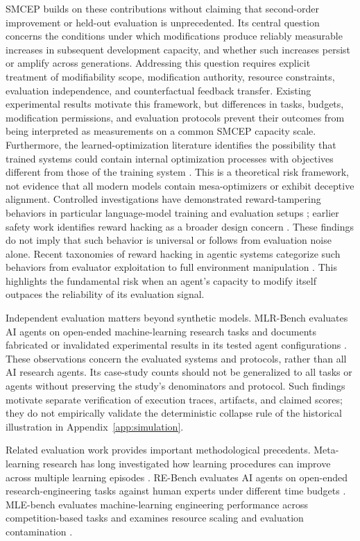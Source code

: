 \documentclass[11pt,a4paper]{article}
\begin{document}
SMCEP builds on these contributions without claiming that second-order improvement or held-out evaluation is unprecedented. Its central question concerns the conditions under which modifications produce reliably measurable increases in subsequent development capacity, and whether such increases persist or amplify across generations. Addressing this question requires explicit treatment of modifiability scope, modification authority, resource constraints, evaluation independence, and counterfactual feedback transfer. Existing experimental results motivate this framework, but differences in tasks, budgets, modification permissions, and evaluation protocols prevent their outcomes from being interpreted as
measurements on a common SMCEP capacity scale. Furthermore, the learned-optimization literature identifies the possibility that trained systems could contain internal optimization processes with objectives different from those of the training system \cite{hubinger2019}. This is a theoretical risk framework, not evidence that all modern models contain mesa-optimizers or exhibit deceptive alignment. Controlled investigations have demonstrated reward-tampering behaviors in particular language-model training and evaluation setups \cite{denison2024}; earlier safety work identifies reward hacking as a broader design concern \cite{amodei2016}. These findings do not imply that such behavior is universal or follows from evaluation noise alone. Recent taxonomies of reward hacking in agentic systems categorize such behaviors from evaluator exploitation to full environment manipulation \cite{morampudi2026}. This highlights the fundamental risk when an agent's capacity to modify itself outpaces the reliability of its evaluation signal.

Independent evaluation matters beyond synthetic models. MLR-Bench evaluates AI agents on open-ended
machine-learning research tasks and documents fabricated or invalidated experimental results in its tested agent configurations \cite{chen2025mlrbench}. These observations concern the evaluated systems
and protocols, rather than all AI research agents. Its case-study counts should not be generalized to all tasks or agents without preserving the study's denominators and protocol. Such findings motivate separate verification of execution traces, artifacts, and claimed scores; they do not empirically validate the deterministic collapse rule of the historical illustration in Appendix~\ref{app:simulation}.

Related evaluation work provides important methodological precedents. Meta-learning research has long investigated how learning procedures can improve across multiple learning episodes \cite{hospedales2021}. RE-Bench evaluates AI agents on open-ended research-engineering tasks against human experts under different time budgets \cite{wijk2025rebench}. MLE-bench evaluates machine-learning engineering performance across competition-based tasks and examines resource scaling and evaluation contamination \cite{chan2025mlebench}.
\end{document}
